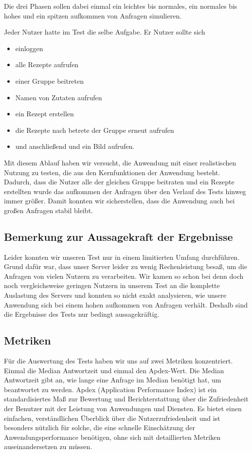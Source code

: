 \documentclass{qualitätssicherungsheft}
\begin{document}
Die drei Phasen sollen dabei einmal ein leichtes bis normales, ein normales bis hohes und ein spitzen aufkommen von Anfragen simulieren.

Jeder Nutzer hatte im Test die selbe Aufgabe.
Er Nutzer sollte sich
\begin{itemize}
    \item einloggen
    \item alle Rezepte aufrufen
    \item einer Gruppe beitreten
    \item Namen von Zutaten aufrufen
    \item ein Rezept erstellen
    \item die Rezepte nach betrete der Gruppe erneut aufrufen
    \item und anschließend  und ein Bild aufrufen.
\end{itemize}
Mit diesem Ablauf haben wir versucht, die Anwendung mit einer realistischen Nutzung zu testen, die aus den Kernfunktionen der Anwendung besteht.
Dadurch, dass die Nutzer alle der gleichen Gruppe beitraten und ein Rezepte erstellten wurde das aufkommen der Anfragen über den Verlauf des Tests hinweg immer größer.
Damit konnten wir sicherstellen, dass die Anwendung auch bei großen Anfragen stabil bleibt.

\subsection{Bemerkung zur Aussagekraft der Ergebnisse}
Leider konnten wir unseren Test nur in einem limitierten Umfang durchführen.
Grund dafür war, dass unser Server leider zu wenig Rechenleistung besaß, um die Anfragen von vielen Nutzern zu verarbeiten.
Wir kamen so schon bei denn doch noch vergleichsweise geringen Nutzern in unserem Test an die komplette Auslastung des Servers und konnten so nicht exakt analysieren, wie unsere Anwendung sich bei einem hohen aufkommen von Anfragen verhält.
Deshalb sind die Ergebnisse des Tests nur bedingt aussagekräftig.

\subsection{Metriken}
Für die Auswertung des Tests haben wir uns auf zwei Metriken konzentriert.
Einmal die Median Antwortzeit und einmal den Apdex-Wert.
Die Median Antwortzeit gibt an, wie lange eine Anfrage im Median benötigt hat, um beantwortet zu werden.
Apdex (Application Performance Index) ist ein standardisiertes Maß zur Bewertung und Berichterstattung über die Zufriedenheit der Benutzer mit der Leistung von Anwendungen und Diensten. Es bietet einen einfachen, verständlichen Überblick über die Nutzerzufriedenheit und ist besonders nützlich für solche, die eine schnelle Einschätzung der Anwendungsperformance benötigen, ohne sich mit detaillierten Metriken auseinandersetzen zu müssen.
\end{document}
